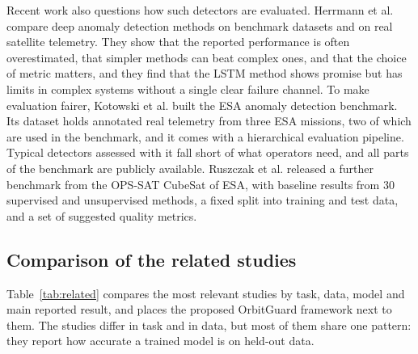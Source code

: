 Recent work also questions how such detectors are evaluated. Herrmann et al. \cite{herrmann2024} compare deep anomaly detection methods on benchmark datasets and on real satellite telemetry. They show that the reported performance is often overestimated, that simpler methods can beat complex ones, and that the choice of metric matters, and they find that the LSTM method shows promise but has limits in complex systems without a single clear failure channel. To make evaluation fairer, Kotowski et al. \cite{kotowski2024} built the ESA anomaly detection benchmark. Its dataset holds annotated real telemetry from three ESA missions, two of which are used in the benchmark, and it comes with a hierarchical evaluation pipeline. Typical detectors assessed with it fall short of what operators need, and all parts of the benchmark are publicly available. Ruszczak et al. \cite{ruszczak2025} released a further benchmark from the OPS-SAT CubeSat of ESA, with baseline results from 30 supervised and unsupervised methods, a fixed split into training and test data, and a set of suggested quality metrics.

\subsection{Comparison of the related studies}
\label{sec:rw-table}

Table~\ref{tab:related} compares the most relevant studies by task, data, model and main reported result, and places the proposed OrbitGuard framework next to them. The studies differ in task and in data, but most of them share one pattern: they report how accurate a trained model is on held-out data.

